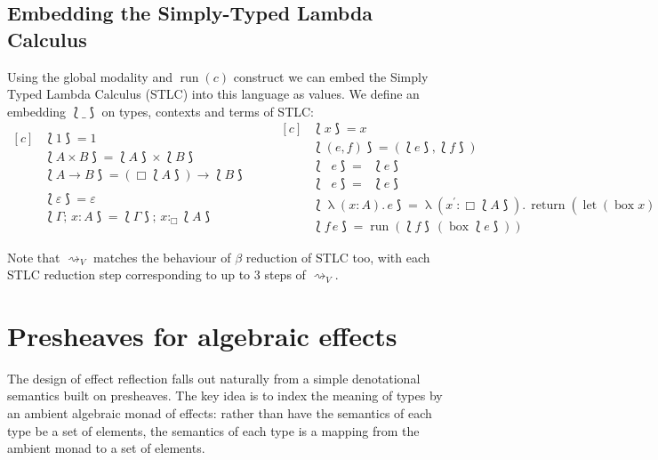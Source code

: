 \documentclass[acmsmall, screen, nonacm]{acmart}
\theoremstyle{definition}
\newcommand{\glob}{\mathop{\Box}}
\newcommand{\fst}{\mathop{\pi_1}}
\newcommand{\snd}{\mathop{\pi_2}}
\newcommand{\abs}[3]{\mathop{\lambda}(#1 \types #2).\,#3}
\newcommand{\app}[2]{#1\,#2}
\newcommand{\types}{\mathrel{:}}
\newcommand{\gtypes}{\mathrel{:_{\Box}}}
\newcommand{\cempty}{\varepsilon}
\newcommand{\ccons}[2]{#1;\,#2}
\newcommand{\lbind}[3]{\ccons{#1}{#2\types#3}}
\newcommand{\gbind}[3]{\ccons{#1}{#2\gtypes#3}}
\newcommand{\return}[1]{\mathop{\mathrm{return}} #1}
\newcommand{\gbox}[1]{\mathop{\mathrm{box}} #1}
\newcommand{\gunbox}[3]{\mathop{\mathrm{let}} (\gbox #1) = #2 \mathop{\mathrm{in}} #3}
\newcommand{\grun}[1]{\mathop{\mathrm{run}}(#1)}
\newcommand{\reducestov}{\rightsquigarrow_V}
\newcommand{\embed}[1]{\mathopen{\lbag}#1\mathclose{\rbag}}
\begin{document}
\subsection{Embedding the Simply-Typed Lambda Calculus}

Using the global modality and $\grun{c}$ construct we can embed the
Simply Typed Lambda Calculus (STLC) into this language as values. We
define an embedding $\embed{\_}$ on types, contexts and terms of STLC:
\begin{equation*}
\begin{aligned}[c]
  &\embed{1} = 1 \\
  &\embed{A \times B} = \embed{A} \times \embed{B} \\
  &\embed{A \rightarrow B} = (\glob \embed{A}) \rightarrow \embed{B} \\ \\
  &\embed{\cempty} = \cempty \\
  &\embed{\lbind{\Gamma}{x}{A}} = \gbind{\embed{\Gamma}}{x}{\embed{A}}
\end{aligned}
\qquad
\begin{aligned}[c]
  &\embed{x} = x \\
  &\embed{(e, f)} = (\embed{e}, \embed{f}) \\
  &\embed{\fst{e}} = \fst{\embed{e}} \\
  &\embed{\snd{e}} = \snd{\embed{e}} \\
  &\embed{\abs{x}{A}{e}} =
    \abs{x^{\prime}}{\glob \embed{A}}{\return{(\gunbox{x}{x^{\prime}}{\embed{e}})}} \\
  &\embed{\app{f}{e}} = \grun{\app{\embed{f}}{(\gbox{\embed{e}})}}
\end{aligned}
\end{equation*}

Note that $\reducestov$ matches the behaviour of $\beta$ reduction of
STLC too, with each STLC reduction step corresponding to up to 3 steps
of $\reducestov$.

\section{Presheaves for algebraic effects}
\label{sec:semantics}

The design of effect reflection falls out naturally from a simple
denotational semantics built on presheaves. The key idea is to index the
meaning of types by an ambient algebraic monad of effects: rather than
have the semantics of each type be a set of elements, the semantics of
each type is a mapping from the ambient monad to a set of elements.
\end{document}
